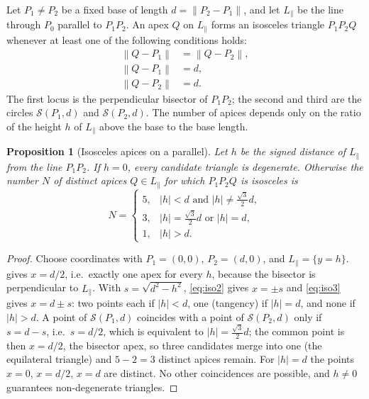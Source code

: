 \documentclass[11pt,a4paper]{article}
\theoremstyle{plain}
\newtheorem{proposition}{Proposition}
\theoremstyle{definition}
\theoremstyle{remark}
\newcommand{\norm}[1]{\left\lVert#1\right\rVert}
\newcommand{\abs}[1]{\left\lvert#1\right\rvert}
\newcommand{\Sph}{\mathcal{S}}
\begin{document}
Let $P_1\neq P_2$ be a fixed base of length $d=\norm{P_2-P_1}$, and let
$L_{\parallel}$ be the line through $P_0$ parallel to $P_1P_2$. An apex $Q$ on
$L_{\parallel}$ forms an isosceles triangle $P_1P_2Q$ whenever at least one of
the following conditions holds:
\begin{align}
  \norm{Q-P_1}&=\norm{Q-P_2}, \label{eq:iso1}\\
  \norm{Q-P_1}&=d, \label{eq:iso2}\\
  \norm{Q-P_2}&=d. \label{eq:iso3}
\end{align}
The first locus is the perpendicular bisector of $P_1P_2$; the second and third
are the circles $\Sph(P_1,d)$ and $\Sph(P_2,d)$. The number of apices depends
only on the ratio of the height $h$ of $L_\parallel$ above the base to the base
length.

\begin{proposition}[Isosceles apices on a parallel]\label{prop:isosceles}
Let $h$ be the signed distance of $L_{\parallel}$ from the line $P_1P_2$. If
$h=0$, every candidate triangle is degenerate. Otherwise the number $N$ of
distinct apices $Q\in L_\parallel$ for which $P_1P_2Q$ is isosceles is
\begin{equation}
  N=\begin{cases}
    5, & \abs{h}<d \text{ and } \abs{h}\neq\tfrac{\sqrt3}{2}d,\\
    3, & \abs{h}=\tfrac{\sqrt3}{2}d \text{ or } \abs{h}=d,\\
    1, & \abs{h}>d.
  \end{cases}
  \label{eq:isosceles-count}
\end{equation}
\end{proposition}

\begin{proof}
Choose coordinates with $P_1=(0,0)$, $P_2=(d,0)$, and $L_\parallel=\{y=h\}$.
 gives $x=d/2$, i.e.\ exactly one apex for every $h$, because the
bisector is perpendicular to $L_\parallel$. With $s=\sqrt{d^2-h^2}$,
\cref{eq:iso2} gives $x=\pm s$ and \cref{eq:iso3} gives $x=d\pm s$: two points
each if $\abs{h}<d$, one (tangency) if $\abs{h}=d$, and none if $\abs{h}>d$.
A point of $\Sph(P_1,d)$ coincides with a point of $\Sph(P_2,d)$ only if
$s=d-s$, i.e.\ $s=d/2$, which is equivalent to $\abs{h}=\tfrac{\sqrt3}{2}d$;
the common point is then $x=d/2$, the bisector apex, so three candidates merge
into one (the equilateral triangle) and $5-2=3$ distinct apices remain. For
$\abs{h}=d$ the points $x=0$, $x=d/2$, $x=d$ are distinct. No other coincidences
are possible, and $h\neq0$ guarantees non-degenerate triangles.
\end{proof}
\end{document}
